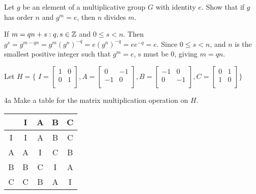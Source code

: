 
\begin{question}{3} Let $g$ be an element of a multiplicative group $G$ with identity $e$. Show that if $g$ has order $n$ and $g^m = e$, then $n$ divides $m$.

If $m = qn + s : q,s \in \mathbb{Z}$ and $0 \leq s < n$. Then $g^s = g^{m-qn} = g^m(g^n)^{-q} = e(g^n)^{-q} = ee^{-q} = e$. Since $0 \leq s < n$, and $n$ is the smallest positive integer such that $g^m = e$, s must be 0, giving $m= qn$.

\end{question}


\begin{question}{4}
Let $H = \{$
$ I =
\begin{bmatrix}
1 & 0 \\
0 & 1 \\
\end{bmatrix},
A = 
\begin{bmatrix}
 0 & -1 \\
-1 &  0 \\
\end{bmatrix},
B = 
\begin{bmatrix}
-1 &  0 \\
 0 & -1 \\
\end{bmatrix},
C = 
\begin{bmatrix}
0 & 1 \\
1 & 0 \\
\end{bmatrix}
\}$
\end{question}

\begin{question}{4a}
Make a table for the matrix multiplication operation on $H$.

\begin{tabular}[c]{c|cccc}
   & I & A & B & C  \\
   \hline
I  & I & A & B & C \\
A  & A & I & C & B \\
B  & B & C & I & A \\
C  & C & B & A & I
\end{tabular}

\end{question}

